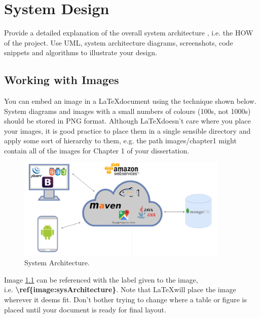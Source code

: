 \chapter{System Design}
Provide a detailed explanation of the overall system architecture \cite{lin1991divergence}, i.e. the HOW of the project.
Use UML, system architecture diagrams, screenshots, code snippets and algorithms to illustrate your design.

\section{Working with Images}
You can embed an image in a \LaTeX document using the technique shown below. System diagrams and images with a small numbers of colours (100s, not 1000s) should be stored in PNG format. Although \LaTeX doesn't care where you place your images, it is good practice to place them in a single sensible directory and apply some sort of hierarchy to them, e.g. the path images/chapter1 might contain all of the images for Chapter 1 of your dissertation.

\begin{figure}[h!]
    \includegraphics[width=0.9\textwidth]{images/architecture.png}
    \caption{System Architecture.}
    \label{image:sysArchitecture}
\end{figure}

Image \ref{image:sysArchitecture} can be referenced with the label given to the image, \\ i.e. \textbf{\textbackslash{}ref\{image:sysArchitecture\}}. Note that \LaTeX will place the image wherever it deems fit. Don't bother trying to change where a table or figure is placed until your document is ready for final layout.